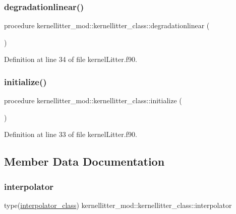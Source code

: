 \subsubsection{\texorpdfstring{degradationlinear()}{degradationlinear()}}
{\footnotesize\ttfamily procedure kernellitter\+\_\+mod\+::kernellitter\+\_\+class\+::degradationlinear (\begin{DoxyParamCaption}{ }\end{DoxyParamCaption})}



Definition at line 34 of file kernel\+Litter.\+f90.

\mbox{\label{structkernellitter__mod_1_1kernellitter__class_a68ea60cecab08969da13adceb6762bc6}} 
\subsubsection{\texorpdfstring{initialize()}{initialize()}}
{\footnotesize\ttfamily procedure kernellitter\+\_\+mod\+::kernellitter\+\_\+class\+::initialize (\begin{DoxyParamCaption}{ }\end{DoxyParamCaption})}



Definition at line 33 of file kernel\+Litter.\+f90.



\subsection{Member Data Documentation}
\mbox{\label{structkernellitter__mod_1_1kernellitter__class_a76f96b14a094f09db8cb72d56fea7ecf}} 
\subsubsection{\texorpdfstring{interpolator}{interpolator}}
{\footnotesize\ttfamily type(\mbox{\hyperlink{structinterpolator__mod_1_1interpolator__class}{interpolator\+\_\+class}}) kernellitter\+\_\+mod\+::kernellitter\+\_\+class\+::interpolator}



